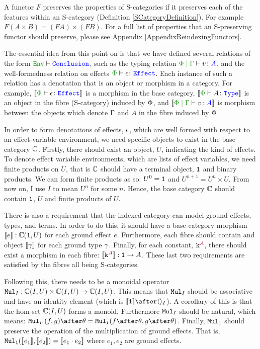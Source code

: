 \documentclass{Report}
\begin{document}
\begin{framed}
    \begin{definition}\label{SPreservingDefinition}
        A functor $F$ preserves the properties of S-categories if it preserves each of the features within an S-category (Definition \ref{SCategoryDefinition}).  For example $F(A\times B) = (FA)\times (FB)$. For a full list of properties that an S-preserving functor should preserve, please see Appendix \ref{AppendixReindexingFunctors}.
    \end{definition}
\end{framed}

The essential idea from this point on is that we have defined several relations of the form $\wellformed{\texttt{Env}}{\texttt{Conclusion}}$, such as the typing relation $\gpetyperelation{v}{A}$, and the well-formedness relation on effects $\wellformedeffect{\P}{\e}$. Each instance of such a relation has a denotation that is an object or morphism in a category. For example, $\deno{\typerelation{\P}{\e}{\effect}}$ is a morphism in the base category, $\deno{\typerelation{\P}{A}{\type}}$ is an object in the fibre (S-category) induced by $\P$, and $\deno{\gpetyperelation{v}{A}}$ is morphism between the objects which denote $\G$ and $A$ in the fibre induced by $\P$.

In order to form denotations of effects, $\e$, which are well formed with respect to an effect-variable environment, we need specific objects to exist in the base category $\C$. Firstly, there should exist an object, $U$, indicating the kind of effects. To denote effect variable environments, which are lists of effect variables, we need finite products on $U$, that is $\C$ should have a terminal object, $\1$ and binary products. We can form finite products as so: $U^0 = \1$ and $U^{n+1} = U^n\times U$. From now on, I use $I$ to mean $U^n$ for some $n$. Hence, the base category $\C$ should contain $\1$, $U$ and finite products of $U$.

There is also a requirement that the indexed category can model ground effects, types, and terms. In order to do this, it should have a base-category morphism $\deno{e}: \C(\1, U)$ for each ground effect $e$. Furthermore, each fibre should contain and object $\deno{\g}$ for each ground type $\g$. Finally, for each constant, $\const{A}$, there should exist a morphism in each fibre: $\deno{\const{A}}: \1 \rightarrow A$. These last two requirements are satisfied by the fibres all being S-categories.

Following this, there needs to be a monoidal operator $\Mul_I: \ciu \times \ciu \rightarrow \ciu$. This means that $\Mul_I$ should be associative and have an identity element (which is $\deno{\1}\after\term{I}$). A corollary of this is that the hom-set $\C(I, U)$ forms a monoid. Furthermore $\Mul_I$ should be natural, which means: $\Mul_{I'}(f, g)\after\theta = \Mul_I(f\after\theta, g\after\theta)$. Finally, $\Mul_\1$ should preserve the operation of the multiplication of ground effects. That is, $\Mul_\1(\deno{e_1},\deno{e_2}) = \deno{e_1\dot e_2}$ where $e_1, e_2$ are ground effects.
\end{document}
